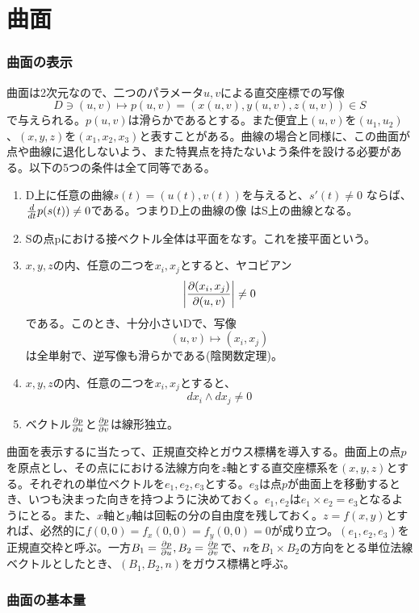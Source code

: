 \part{曲面}

\section{曲面の表示}
    曲面は2次元なので、二つのパラメータ$u,v$による直交座標での写像
        \[D\ni (u,v)\longmapsto p(u,v) = (x(u,v),y(u,v),z(u,v))\in S\]
    で与えられる。$p(u,v)$は滑らかであるとする。また便宜上$(u,v)$を$(u_1,u_2)$、$(x,y,z)$を$(x_1,x_2,x_3)$と表すことがある。曲線の場合と同様に、この曲面が点や曲線に退化しないよう、また特異点を持たないよう条件を設ける必要がある。以下の5つの条件は全て同等である。
    \begin{enumerate}
        \item D上に任意の曲線$s(t)=(u(t),v(t))$を与えると、$s'(t)\neq 0$
              ならば、$\di{t}p(s(t))\neq 0$である。つまりD上の曲線の像
              はS上の曲線となる。
        \item Sの点pにおける接ベクトル全体は平面をなす。これを接平面という。
        \item $x,y,z$の内、任意の二つを$x_i,x_j$とすると、ヤコビアン
                  \[\left|\pd[(x_i,x_j)]{(u,v)}\right|\neq 0\]
              である。このとき、十分小さいDで、写像
                  \[(u,v)\longmapsto (x_i,x_j)\]
              は全単射で、逆写像も滑らかである(陰関数定理)。
        \item $x,y,z$の内、任意の二つを$x_i,x_j$とすると、
                  \[dx_i\wedge dx_j\neq 0\]
        \item ベクトル$\pd[p]{u}$と$\pd[p]{v}$は線形独立。
    \end{enumerate}
    曲面を表示するに当たって、正規直交枠とガウス標構を導入する。曲面上の点$p$を原点とし、その点ににおける法線方向を$z$軸とする直交座標系を$(x,y,z)$とする。それぞれの単位ベクトルを$e_1,e_2,e_3$とする。$e_3$は点$p$が曲面上を移動するとき、いつも決まった向きを持つように決めておく。$e_1,e_2$は$e_1\times e_2 = e_3$となるようにとる。また、$x$軸と$y$軸は回転の分の自由度を残しておく。$z=f(x,y)$とすれば、必然的に$f(0,0)=f_x(0,0)=f_y(0,0)=0$が成り立つ。$(e_1,e_2,e_3)$を正規直交枠と呼ぶ。一方$B_1=\pd[p]{u},B_2=\pd[p]{v}$で、$n$を$B_1\times B_2$の方向をとる単位法線ベクトルとしたとき、$(B_1,B_2,n)$をガウス標構と呼ぶ。

\section{曲面の基本量}
